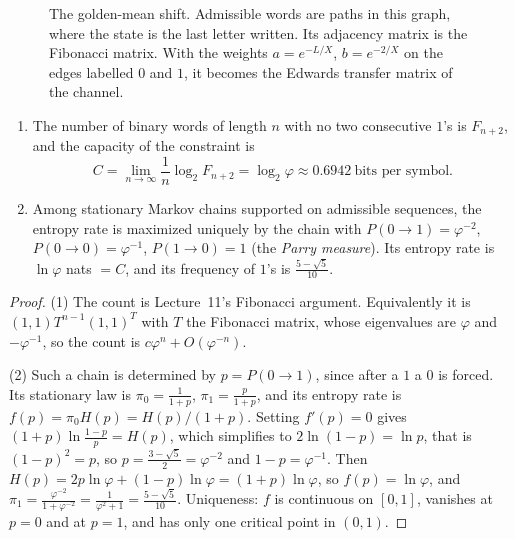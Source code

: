 \begin{figure}[ht]
\centering
{}
\caption{The golden-mean shift. Admissible words are paths in this graph, where the state is the last
letter written. Its adjacency matrix is the Fibonacci matrix. With the weights $a=e^{-L/X}$, $b=e^{-2/X}$ on
the edges labelled $0$ and $1$, it becomes the Edwards transfer matrix of the channel.}
\label{SM:fig:golden}
\end{figure}

\begin{theorem}\label{SM:thm:golden}
\begin{enumerate}[nosep]
\item The number of binary words of length $n$ with no two consecutive $1$'s is $F_{n+2}$, and the
  capacity of the constraint is
  \[
    C=\lim_{n\to\infty}\frac1n\log_2F_{n+2}=\log_2\varphi\approx0.6942\ \text{bits per symbol}.
  \]
\item Among stationary Markov chains supported on admissible sequences, the entropy rate is maximized
  uniquely by the chain with $P(0\to1)=\varphi^{-2}$, $P(0\to0)=\varphi^{-1}$, $P(1\to0)=1$ (the
  \emph{Parry measure}). Its entropy rate is $\ln\varphi$ nats $=C$, and its frequency of $1$'s is
  $\frac{5-\sqrt5}{10}$.
\end{enumerate}
\end{theorem}

\begin{proof}
(1) The count is Lecture~11's Fibonacci argument. Equivalently it is $(1,1)T^{n-1}(1,1)^T$ with $T$ the
Fibonacci matrix, whose eigenvalues are $\varphi$ and $-\varphi^{-1}$, so the count is $c\varphi^n+O(\varphi^{-n})$.

(2) Such a chain is determined by $p=P(0\to1)$, since after a $1$ a $0$ is forced. Its stationary law
is $\pi_0=\frac1{1+p}$, $\pi_1=\frac p{1+p}$, and its entropy rate is $f(p)=\pi_0H(p)=H(p)/(1+p)$. Setting
$f'(p)=0$ gives $(1+p)\ln\frac{1-p}{p}=H(p)$, which simplifies to $2\ln(1-p)=\ln p$, that is
$(1-p)^2=p$, so $p=\frac{3-\sqrt5}2=\varphi^{-2}$ and $1-p=\varphi^{-1}$. Then
$H(p)=2p\ln\varphi+(1-p)\ln\varphi=(1+p)\ln\varphi$, so $f(p)=\ln\varphi$, and
$\pi_1=\frac{\varphi^{-2}}{1+\varphi^{-2}}=\frac1{\varphi^2+1}=\frac{5-\sqrt5}{10}$. Uniqueness: $f$ is
continuous on $[0,1]$, vanishes at $p=0$ and at $p=1$, and has only one critical point in $(0,1)$.
\end{proof}

